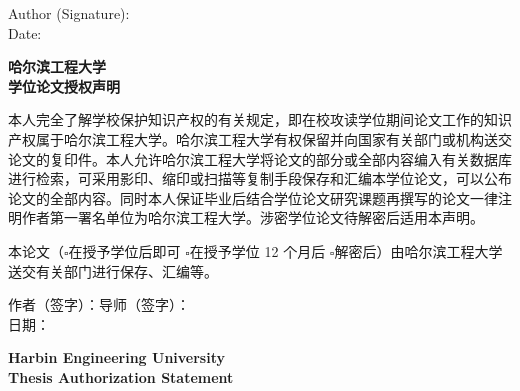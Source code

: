 \vspace{2cm}

\begin{flushright}
Author (Signature):\underline{\makebox[4cm]{}}\\[0.5cm]
Date:\underline{}
\end{flushright}

\clearpage
\thispagestyle{empty}
\begin{center}
{\fontsize{16pt}{24pt}\selectfont\bfseries 哈尔滨工程大学}\\[0.5cm]
{\fontsize{16pt}{24pt}\selectfont\bfseries 学位论文授权声明}
\end{center}

\vspace{1cm}

\fontsize{12pt}{22pt}\selectfont
\setlength{\parindent}{2em}

本人完全了解学校保护知识产权的有关规定，即在校攻读学位期间论文工作的知识产权属于哈尔滨工程大学。哈尔滨工程大学有权保留并向国家有关部门或机构送交论文的复印件。本人允许哈尔滨工程大学将论文的部分或全部内容编入有关数据库进行检索，可采用影印、缩印或扫描等复制手段保存和汇编本学位论文，可以公布论文的全部内容。同时本人保证毕业后结合学位论文研究课题再撰写的论文一律注明作者第一署名单位为哈尔滨工程大学。涉密学位论文待解密后适用本声明。

本论文（$\square$在授予学位后即可  $\square$在授予学位 12 个月后  $\square$解密后）由哈尔滨工程大学送交有关部门进行保存、汇编等。

\vspace{2cm}

\begin{flushright}
作者（签字）：\underline{\makebox[3cm]{}}\qquad 导师（签字）：\underline{\makebox[3cm]{}}\\[0.8cm]
日期：\underline{}\qquad \underline{}
\end{flushright}

\clearpage
\thispagestyle{empty}
\begin{center}
{\fontsize{16pt}{24pt}\selectfont\bfseries Harbin Engineering University}\\[0.5cm]
{\fontsize{16pt}{24pt}\selectfont\bfseries Thesis Authorization Statement}
\end{center}

\vspace{1cm}

\fontsize{12pt}{22pt}\selectfont
\setlength{\parindent}{2em}


